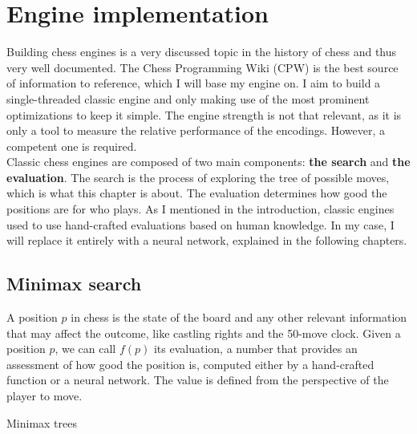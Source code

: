 \section{Engine implementation}

Building chess engines is a very discussed topic in the history of chess and thus very well documented. The Chess Programming Wiki (CPW) \cite{cpw} is the best source of information to reference, which I will base my engine on. I aim to build a single-threaded classic engine and only making use of the most prominent optimizations to keep it simple. The engine strength is not that relevant, as it is only a tool to measure the relative performance of the encodings. However, a competent one is required. \\

Classic chess engines are composed of two main components: \textbf{the search} and \textbf{the evaluation}. The search is the process of exploring the tree of possible moves, which is what this chapter is about. The evaluation determines how good the positions are for who plays. As I mentioned in the introduction, classic engines used to use hand-crafted evaluations based on human knowledge. In my case, I will replace it entirely with a neural network, explained in the following chapters.

\subsection{Minimax search}

A position $p$ in chess is the state of the board and any other relevant information that may affect the outcome, like castling rights and the 50-move clock. Given a position $p$, we can call $f(p)$ its evaluation, a number that provides an assessment of how good the position is, computed either by a hand-crafted function or a neural network. The value is defined from the perspective of the player to move.

Minimax trees \cite{minimax-survey:1995} 



